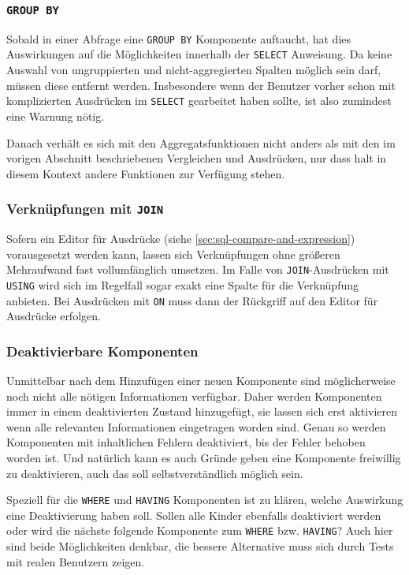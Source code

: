 \subsubsection{\texttt{GROUP BY}}

Sobald in einer Abfrage eine \texttt{GROUP BY} Komponente auftaucht, hat dies Auswirkungen auf die Möglichkeiten innerhalb der \texttt{SELECT} Anweisung. Da keine Auswahl von ungruppierten und nicht-aggregierten Spalten möglich sein darf, müssen diese entfernt werden. Insbesondere wenn der Benutzer vorher schon mit komplizierten Ausdrücken im \texttt{SELECT} gearbeitet haben sollte, ist also zumindest eine Warnung nötig.

Danach verhält es sich mit den Aggregatsfunktionen nicht anders als mit den im vorigen Abschnitt beschriebenen Vergleichen und Ausdrücken, nur dass halt in diesem Kontext andere Funktionen zur Verfügung stehen.

\subsubsection{Verknüpfungen mit \texttt{JOIN}}

Sofern ein Editor für Ausdrücke (siehe \ref{sec:sql-compare-and-expression}) vorausgesetzt werden kann, lassen sich Verknüpfungen ohne größeren Mehraufwand fast vollumfänglich umsetzen. Im Falle von \texttt{JOIN}-Ausdrücken mit \texttt{USING} wird sich im Regelfall sogar exakt eine Spalte für die Verknüpfung anbieten. Bei Ausdrücken mit \texttt{ON} muss dann der Rückgriff auf den Editor für Ausdrücke erfolgen.

\subsubsection{Deaktivierbare Komponenten}

Unmittelbar nach dem Hinzufügen einer neuen Komponente sind möglicherweise noch nicht alle nötigen Informationen verfügbar. Daher werden Komponenten immer in einem deaktivierten Zustand hinzugefügt, sie lassen sich erst aktivieren wenn alle relevanten Informationen eingetragen worden sind. Genau so werden Komponenten mit inhaltlichen Fehlern deaktiviert, bis der Fehler behoben worden ist. Und natürlich kann es auch Gründe geben eine Komponente freiwillig zu deaktivieren, auch das soll selbstverständlich möglich sein.

Speziell für die \texttt{WHERE} und \texttt{HAVING} Komponenten ist zu klären, welche Auswirkung eine Deaktivierung haben soll. Sollen alle Kinder ebenfalls deaktiviert werden oder wird die nächste folgende Komponente zum \texttt{WHERE} bzw. \texttt{HAVING}? Auch hier sind beide Möglichkeiten denkbar, die bessere Alternative muss sich durch Tests mit realen Benutzern zeigen.


